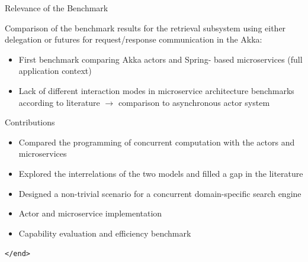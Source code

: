 \documentclass{beamer}
\begin{document}

\begin{frame}{Relevance of the Benchmark}

Comparison of the benchmark results for the retrieval subsystem using either delegation or futures for request/response communication in the Akka:

\begin{itemize}
  \item First benchmark comparing Akka actors and Spring- based microservices (full application context)
  \item Lack of different interaction modes in microservice architecture benchmarks according to literature $\rightarrow$ comparison to asynchronous actor system
\end{itemize}

\end{frame}


\begin{frame}{Contributions}

\begin{itemize}
  \item Compared the programming of concurrent computation with the actors and microservices
  \item Explored the interrelations of the two models and filled a gap in the literature
  \item Designed a non-trivial scenario for a concurrent domain-specific search engine
  \item Actor and microservice implementation
  \item Capability evaluation and efficiency benchmark
\end{itemize}

\end{frame}



\begin{frame}{}

\begin{center}
  \texttt{</end>}
\end{center}

\end{frame}

\end{document}
